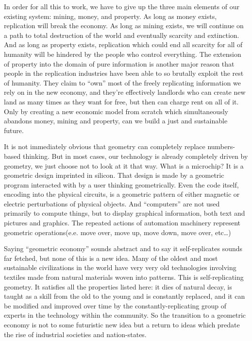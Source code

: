 In order for all this to work, we have to give up the three main
elements of our existing system: mining, money, and property. As long as
money exists, replication will break the economy. As long as mining
exists, we will continue on a path to total destruction of the world and
eventually scarcity and extinction. And as long as property exists,
replication which could end all scarcity for all of humanity will be
hindered by the people who control everything. The extension of property
into the domain of pure information is another major reason that people
in the replication industries have been able to so brutally exploit the
rest of humanity. They claim to ``own'' most of the freely replicating
information we rely on in the new economy, and they're effectively
landlords who can create new land as many times as they want for free,
but then can charge rent on all of it. Only by creating a new economic
model from scratch which simultaneously abandons money, mining and
property, can we build a just and sustainable future.

It is not immediately obvious that geometry can completely replace
numbers-based thinking. But in most cases, our technology is already
completely driven by geometry, we just choose not to look at it that
way. What is a microchip? It is a geometric design imprinted in silicon.
That design is made by a geometric program interacted with by a user
thinking geometrically. Even the code itself, encoding into the physical
circuits, is a geometric pattern of either magnetic or electric
perturbations of physical objects. And ``computers'' are not used
primarily to compute things, but to display graphical information, both
text and pictures and graphics. The repeated actions of automation
machinery represent geometric operations(e.e. move over, move up, move
down, move over, etc\ldots{})

Saying ``geometric economy'' sounds abstract and to say it
self-replicates sounds far fetched, but none of this is a new idea. Many
of the oldest and most sustainable civilizations in the world have very
very old technologies involving textiles made from natural materials
woven into patterns. This is self-replicating geometry. It satisfies all
the properties listed here: it dies of natural decay, is taught as a
skill from the old to the young and is constantly replaced, and it can
be modified and improved over time by the constantly-replicating group
of experts in the technology within the community. So the transition to
a geometric economy is not to some futuristic new idea but a return to
ideas which predate the rise of industrial societies and nation-states.

